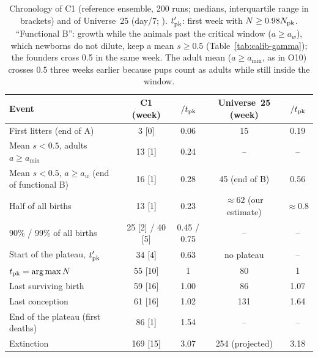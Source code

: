 \begin{table}[t]
  \centering
  \caption{Chronology of \textsf{C1} (reference ensemble, 200 runs; medians, interquartile range in
  brackets) and of Universe~25 (day/7; \cite{Calhoun1973}). $t'_{\rm pk}$: first week with $N\ge0.98N_{\rm pk}$.
  ``Functional B'': growth while the animals past the critical window ($a\ge a_w$), which newborns do not dilute,
  keep a mean $s\ge0.5$ (Table~\ref{tab:calib-gamma}); the founders cross 0.5 in the same week. The adult mean
  ($a\ge a_{\min}$, as in O10) crosses 0.5 three weeks earlier because pups count as adults while still inside the
  window.}
  \label{tab:calib-chrono}
  \small
  \begin{tabular}{@{}lcccc@{}}
    \toprule
    Event & \textsf{C1} (week) & $/t_{\rm pk}$ & Universe~25 (week) & $/t_{\rm pk}$ \\
    \midrule
    First litters (end of A) & 3 [0] & 0.06 & 15 & 0.19 \\
    Mean $s<0.5$, adults $a\ge a_{\min}$ & 13 [1] & 0.24 & -- & -- \\
    Mean $s<0.5$, $a\ge a_w$ (end of functional B) & 16 [1] & 0.28 & 45 (end of B) & 0.56 \\
    Half of all births & 13 [1] & 0.23 & $\approx62$ (our estimate) & $\approx0.8$ \\
    90\% / 99\% of all births & 25 [2] / 40 [5] & 0.45 / 0.75 & -- & -- \\
    Start of the plateau, $t'_{\rm pk}$ & 34 [4] & 0.63 & no plateau & -- \\
    $t_{\rm pk}=\arg\max N$ & 55 [10] & 1 & 80 & 1 \\
    Last surviving birth & 59 [16] & 1.00 & 86 & 1.07 \\
    Last conception & 61 [16] & 1.02 & 131 & 1.64 \\
    End of the plateau (first deaths) & 86 [1] & 1.54 & -- & -- \\
    Extinction & 169 [15] & 3.07 & 254 (projected) & 3.18 \\
    \bottomrule
  \end{tabular}
\end{table}

